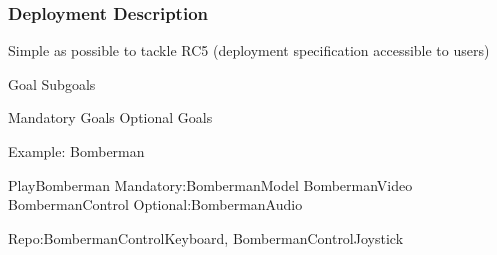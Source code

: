 \subsubsection{Deployment Description}

Simple as possible to tackle RC5 (deployment specification accessible to users)


Goal
Subgoals

Mandatory Goals
Optional Goals


Example:
Bomberman

PlayBomberman
Mandatory:BombermanModel
BombermanVideo
BombermanControl
Optional:BombermanAudio

Repo:BombermanControlKeyboard, BombermanControlJoystick
